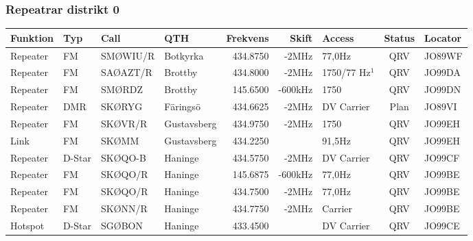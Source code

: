 \begin{landscape}
\subsubsection{Repeatrar distrikt 0}
\footnotesize
\begin{longtable}{llllrrlcl}
	\textbf{Funktion} & \textbf{Typ} & \textbf{Call} & \textbf{QTH} & \textbf{Frekvens} & \textbf{Skift} & \textbf{Access} & \textbf{Status} & \textbf{Locator} \\ \hline
	\endhead
	Repeater          & FM           & SMØWIU/R      & Botkyrka     & 434.8750          & -2MHz          & 77,0Hz          & QRV             & JO89WF           \\
	Repeater          & FM           & SAØAZT/R      & Brottby      & 434.8000          & -2MHz          & 1750/77 Hz$^1$  & QRV             & JO99DA           \\
	Repeater          & FM           & SMØRDZ        & Brottby      & 145.6500          & -600kHz        & 1750            & QRV             & JO99DN           \\
	Repeater          & DMR          & SKØRYG        & Färingsö     & 434.6625          & -2MHz          & DV Carrier      & Plan            & JO89VI           \\
	Repeater          & FM           & SKØVR/R       & Gustavsberg  & 434.9750          & -2MHz          & 1750            & QRV             & JO99EH           \\
	Link              & FM           & SKØMM         & Gustavsberg  & 434.2250          &                & 91,5Hz          & QRV             & JO99EH           \\
	Repeater          & D-Star       & SKØQO-B       & Haninge      & 434.5750          & -2MHz          & DV Carrier      & QRV             & JO99CF           \\
	Repeater          & FM           & SKØQO/R       & Haninge      & 145.6875          & -600kHz        & 77,0Hz          & QRV             & JO99BE           \\
	Repeater          & FM           & SKØQO/R       & Haninge      & 434.7500          & -2MHz          & 77,0Hz          & QRV             & JO99BE           \\
	Repeater          & FM           & SKØNN/R       & Haninge      & 434.7750          & -2MHz          & Carrier         & QRV             & JO99BE           \\
	Hotspot           & D-Star       & SGØBON        & Haninge      & 433.4500          &                & DV Carrier      & QRV             & JO99CE           \\

\end{longtable}
\end{landscape}
